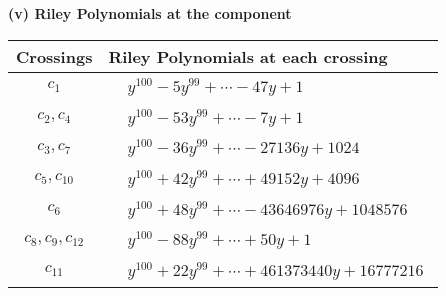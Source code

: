 \documentclass[1p]{elsarticle_modified}
\theoremstyle{definition}
\begin{document}
\flushleft \textbf{(v) Riley Polynomials at the component}\newline \\
\begin{tabular}{m{50pt}|m{274pt}}
Crossings & \hspace{64pt}Riley Polynomials at each crossing \\
\hline $$\begin{aligned}c_{1}\end{aligned}$$&$\begin{aligned}
&y^{100}-5 y^{99}+\cdots-47 y+1
\end{aligned}$\\
\hline $$\begin{aligned}c_{2},c_{4}\end{aligned}$$&$\begin{aligned}
&y^{100}-53 y^{99}+\cdots-7 y+1
\end{aligned}$\\
\hline $$\begin{aligned}c_{3},c_{7}\end{aligned}$$&$\begin{aligned}
&y^{100}-36 y^{99}+\cdots-27136 y+1024
\end{aligned}$\\
\hline $$\begin{aligned}c_{5},c_{10}\end{aligned}$$&$\begin{aligned}
&y^{100}+42 y^{99}+\cdots+49152 y+4096
\end{aligned}$\\
\hline $$\begin{aligned}c_{6}\end{aligned}$$&$\begin{aligned}
&y^{100}+48 y^{99}+\cdots-43646976 y+1048576
\end{aligned}$\\
\hline $$\begin{aligned}c_{8},c_{9},c_{12}\end{aligned}$$&$\begin{aligned}
&y^{100}-88 y^{99}+\cdots+50 y+1
\end{aligned}$\\
\hline $$\begin{aligned}c_{11}\end{aligned}$$&$\begin{aligned}
&y^{100}+22 y^{99}+\cdots+461373440 y+16777216
\end{aligned}$\\
\hline
\end{tabular}\\~\\
\end{document}
